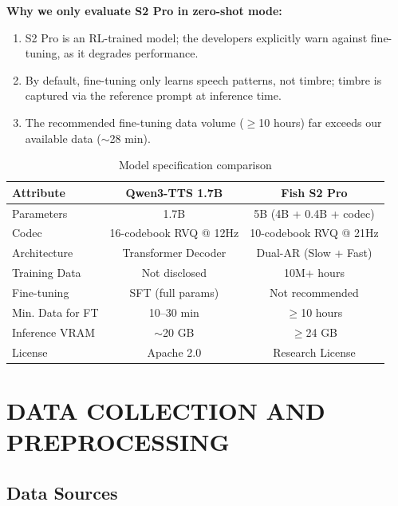 \documentclass{ar-1col}
\begin{document}
\textbf{Why we only evaluate S2 Pro in zero-shot mode:}
\begin{enumerate}
    \item S2 Pro is an RL-trained model; the developers explicitly warn against fine-tuning, as it degrades performance.
    \item By default, fine-tuning only learns speech patterns, not timbre; timbre is captured via the reference prompt at inference time.
    \item The recommended fine-tuning data volume ($\geq$10 hours) far exceeds our available data ($\sim$28 min).
\end{enumerate}

\begin{table}[H]
\caption{Model specification comparison}
\label{tab:models}
\begin{center}
\begin{tabular}{@{}lcc@{}}
\toprule
\textbf{Attribute} & \textbf{Qwen3-TTS 1.7B} & \textbf{Fish S2 Pro} \\
\midrule
Parameters & 1.7B & 5B (4B + 0.4B + codec) \\
Codec & 16-codebook RVQ @ 12Hz & 10-codebook RVQ @ 21Hz \\
Architecture & Transformer Decoder & Dual-AR (Slow + Fast) \\
Training Data & Not disclosed & 10M+ hours \\
Fine-tuning & SFT (full params) & Not recommended \\
Min. Data for FT & 10--30 min & $\geq$10 hours \\
Inference VRAM & $\sim$20 GB & $\geq$24 GB \\
License & Apache 2.0 & Research License \\
\bottomrule
\end{tabular}
\end{center}
\end{table}


\section{DATA COLLECTION AND PREPROCESSING}

\subsection{Data Sources}
\end{document}

